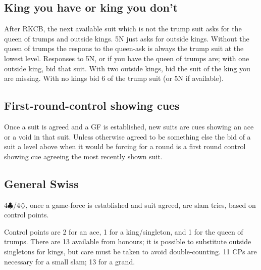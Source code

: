 \documentclass[a4paper,14pt]{extarticle}
\begin{document}
\newpage

\subsection{King you have or king you don't}
\label{sec:kyhokyd}

After RKCB, the next available suit which is not the trump suit asks for the
queen of trumps and outside kings. 5N just asks for outside kings. Without the
queen of trumps the respons to the queen-ask is always the trump suit at the
lowest level. Responses to 5N, or if you have the queen of trumps are; with one
outside king, bid that suit. With two outside kings, bid the suit of the king
you are missing. With no kings bid 6 of the trump suit (or 5N if available).

\subsection{First-round-control showing cues}
\label{sec:cues}

Once a suit is agreed and a GF is established, new suits are cues showing an
ace or a void in that suit. Unless otherwise agreed to be something else the
bid of a suit a level above when it would be forcing for a round is a first round
control showing cue agreeing the most recently shown suit.

\subsection{General Swiss}
\label{sec:swiss}

4$\clubsuit$/4$\diamondsuit$, once a game-force is established and suit agreed, are slam tries, based
on control points.

Control points are 2 for an ace, 1 for a king/singleton, and 1 for the queen of
trumps.  There are 13 available from honours; it is possible to substitute
outside singletons for kings, but care must be taken to avoid double-counting.
11 CPs are necessary for a small slam; 13 for a grand.
\end{document}

